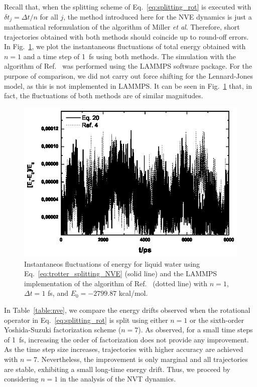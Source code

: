 \documentclass[aip,jcp,reprint,amsmath,amssymb]{revtex4-1}
\begin{document}
Recall that, when the splitting scheme of Eq.~\ref{eq:splitting_rot} is executed with $\delta t_j = \Delta t/n$ for all $j$, the method introduced here for the NVE dynamics is just a mathematical reformulation of the algorithm of Miller \textit{et al}.\cite{Miller2002} Therefore, short trajectories obtained with both methods should coincide up to round-off errors. In Fig.~\ref{fig:miller1fs}, we plot the instantaneous fluctuations of total energy obtained with $n = 1$ and a time step of 1~fs using both methods. The simulation with the algorithm of Ref.~ was performed using the LAMMPS software package.\cite{Plimpton1995} For the purpose of comparison, we did not carry out force shifting for the Lennard-Jones model, as this is not implemented in LAMMPS. It can be seen in Fig.~\ref{fig:miller1fs} that, in fact, the fluctuations of both methods are of similar magnitudes.

\begin{figure}
	\includegraphics{millerourmd}
	\caption{Instantaneos fluctuations of energy for liquid water using Eq.~\ref{eq:trotter_splitting_NVE} (solid line) and the LAMMPS implementation of the algorithm of Ref.~ (dotted line) with $n = 1$, $\Delta t = 1$ fs, and $E_0 = -2799.87$ kcal/mol.}
	\label{fig:miller1fs}
\end{figure}

In Table~\ref{table:nve}, we compare the energy drifts observed when the rotational operator in Eq.~\ref{eq:splitting_rot} is split using either $n = 1$ or the sixth-order Yoshida-Suzuki factorization scheme ($n = 7$). As observed, for a small time steps of 1~fs, increasing the order of factorization does not provide any improvement. As the time step size increases, trajectories with higher accuracy are achieved with $n = 7$. Nevertheless, the improvement is only marginal and all trajectories are stable, exhibiting a small long-time energy drift. Thus, we proceed by considering $n = 1$ in the analysis of the NVT dynamics.
\end{document}
